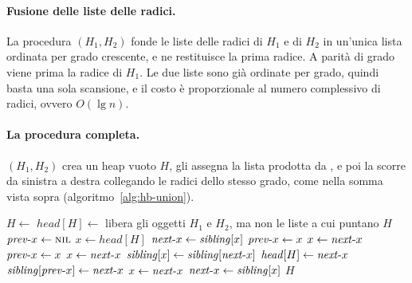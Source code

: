 \paragraph{Fusione delle liste delle radici.}
La procedura \BinomialHeapMerge$(H_1,H_2)$ fonde le liste delle radici di $H_1$ e di $H_2$ in un'unica lista ordinata per grado crescente, e ne restituisce la prima radice. A parità di grado viene prima la radice di $H_1$. Le due liste sono già ordinate per grado, quindi basta una sola scansione, e il costo è proporzionale al numero complessivo di radici, ovvero $O(\lg n)$.

\paragraph{La procedura completa.}
\BinomialHeapUnion$(H_1,H_2)$ crea un heap vuoto $H$, gli assegna la lista prodotta da \BinomialHeapMerge{}, e poi la scorre da sinistra a destra collegando le radici dello stesso grado, come nella somma vista sopra (algoritmo~\ref{alg:hb-union}).

\begin{algorithm}[htbp]
\caption{L'unione di due heap binomiali: la fusione delle liste delle radici, poi il collegamento delle radici dello stesso grado.}\label{alg:hb-union}
\begin{algorithmic}[1]
  \State $H \gets$ 
  \State $\mathit{head}[H] \gets$ 
  \State libera gli oggetti $H_1$ e $H_2$, ma non le liste a cui puntano
    \State \Return $H$
  \EndIf
  \State $\mathit{prev}\text{-}x \gets \textsc{nil}$
  \State $x \gets \mathit{head}[H]$
  \State $\mathit{next}\text{-}x \gets \mathit{sibling}[x]$
  \While{$\nextx \ne \Nil$}
      \State $\mathit{prev}\text{-}x \gets x$ 
      \State $x \gets \mathit{next}\text{-}x$
      \State $\mathit{prev}\text{-}x \gets x$ 
      \State $x \gets \mathit{next}\text{-}x$
      \State $\mathit{sibling}[x] \gets \mathit{sibling}[\mathit{next}\text{-}x]$ 
      \State {}
    \Else
      \If{$\prevx = \Nil$} 
        \State $\mathit{head}[H] \gets \mathit{next}\text{-}x$
      \Else
        \State $\mathit{sibling}[\mathit{prev}\text{-}x] \gets \mathit{next}\text{-}x$
      \EndIf
      \State {}
      \State $x \gets \mathit{next}\text{-}x$
    \EndIf
    \State $\mathit{next}\text{-}x \gets \mathit{sibling}[x]$
  \EndWhile
  \State \Return $H$
\EndProcedure
\end{algorithmic}
\end{algorithm}

